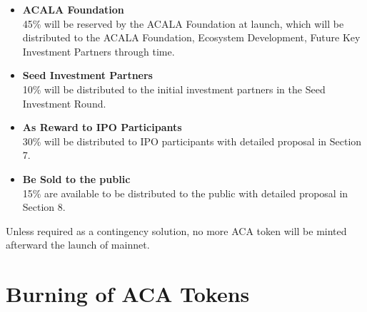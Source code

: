 \documentclass{article}
\begin{document}
\begin{itemize}
    \item \textbf{ACALA Foundation} \\
    45\% will be reserved by the ACALA Foundation at launch, which will be distributed to the ACALA Foundation, Ecosystem Development, Future Key Investment Partners through time.
    
    \item \textbf{Seed Investment Partners} \\
    10\% will be distributed to the initial investment partners in the Seed Investment Round.

    \item \textbf{As Reward to IPO Participants} \\
    30\% will be distributed to IPO participants with detailed proposal in Section 7.
    
    \item \textbf{Be Sold to the public} \\
    15\% are available to be distributed to the public with detailed proposal in Section 8.
     
\end{itemize}

Unless required as a contingency solution, no more ACA token will be minted afterward the launch of mainnet.


\section{Burning of ACA Tokens}
\end{document}
